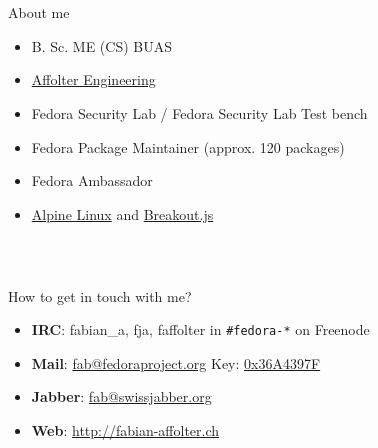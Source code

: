 \begin{frame}
\frametitle{\\}
%
{\LARGE About me \newline}
\begin{itemize}
  \item B. Sc. ME (CS) BUAS
  \item \href{http://affolter-engineering.ch/}{Affolter Engineering} \newline
  \item Fedora Security Lab / Fedora Security Lab Test bench
  \item Fedora Package Maintainer (approx. 120 packages)
  \item Fedora Ambassador
  \item \href{http://alpinelinux.org/}{Alpine Linux} and \href{http://breakoutjs.com/}{Breakout.js}
\end{itemize}
\end{frame}

\begin{frame}
\frametitle{\\}
%
{\LARGE How to get in touch with me? \newline}
\begin{itemize}
  \item \textbf{IRC}: fabian\_a, fja, faffolter in \texttt{\#fedora-*} on Freenode
  \item \textbf{Mail}: \href{mailto:fab@fedoraproject.org}{fab@fedoraproject.org}  {\scriptsize Key: \href{http://pgp.mit.edu:11371/pks/lookup?op=get&search=0xE23CD2DD36A4397F}{0x36A4397F}}
  \item \textbf{Jabber}: \href{fab@swissjabber.org}{fab@swissjabber.org}
  \item \textbf{Web}: \href{http://fabian-affolter.ch}{http://fabian-affolter.ch}
\end{itemize}
\end{frame}
